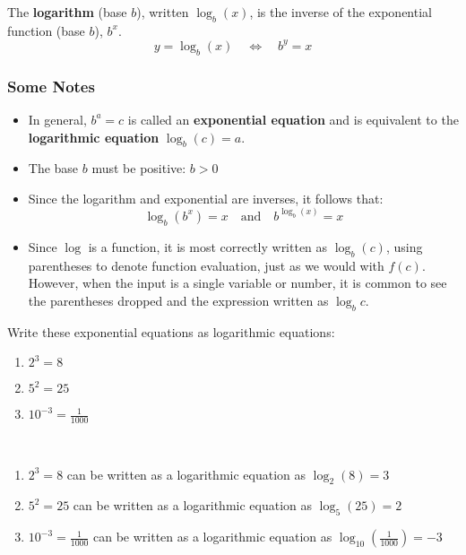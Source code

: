 \begin{definition}
    The \textbf{logarithm} (base \( b \)), written \( \log_b(x) \), is the inverse of the exponential function (base \( b \)), \( b^x \).
    \[
        y = \log_b(x) \quad \Leftrightarrow \quad b^y = x
    \]
\end{definition}

\subsubsection*{Some Notes}
\begin{itemize}
    \item In general, \( b^a = c \) is called an \textbf{exponential equation} and is equivalent to the \textbf{logarithmic equation} \( \log_b(c) = a \).
    \item The base \( b \) must be positive: \( b>0 \)
    \item Since the logarithm and exponential are inverses, it follows that:
          \[
              \log_b(b^x) = x \quad \text{and} \quad b^{\log_b(x)} = x
          \]
    \item Since $\log$ is a function, it is most correctly written as $\log_b (c)$, using parentheses to denote function evaluation, just as we would with $f(c)$. However, when the input is a single variable or number, it is common to see the parentheses dropped and the expression written as $\log_b c$.
\end{itemize}

\begin{example}
    Write these exponential equations as logarithmic equations:
    \begin{enumerate}
        \item $2^3 = 8$
        \item $5^2 = 25$
        \item $10^{-3} = \frac{1}{1000}$
    \end{enumerate}
\end{example}
\begin{solution} ~

    \begin{enumerate}
        \item $2^3 = 8$ can be written as a logarithmic equation as $\log_2(8) = 3$
        \item $5^2 = 25$ can be written as a logarithmic equation as $\log_5(25) = 2$
        \item $10^{-3} = \frac{1}{1000}$ can be written as a logarithmic equation as $\log_{10}\left( \frac{1}{1000} \right) = -3$
    \end{enumerate}
\end{solution}

